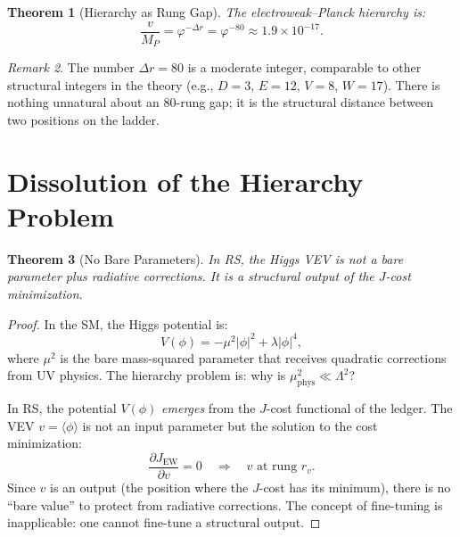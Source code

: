 \documentclass[12pt,a4paper]{article}
\newtheorem{theorem}{Theorem}[section]
\theoremstyle{definition}
\theoremstyle{remark}
\newtheorem{remark}[theorem]{Remark}
\begin{document}
\begin{theorem}[Hierarchy as Rung Gap]
\label{thm:hierarchy}
The electroweak--Planck hierarchy is:
\begin{equation}
  \boxed{\frac{v}{M_P} = \varphi^{-\Delta r}
  = \varphi^{-80} \approx 1.9 \times 10^{-17}.}
  \label{eq:hierarchy}
\end{equation}
\end{theorem}

\begin{remark}
The number $\Delta r = 80$ is a moderate integer, comparable
to other structural integers in the theory (e.g., $D = 3$,
$E = 12$, $V = 8$, $W = 17$).  There is nothing unnatural
about an 80-rung gap; it is the structural distance between
two positions on the ladder.
\end{remark}

\section{Dissolution of the Hierarchy Problem}
\label{sec:dissolution}

\begin{theorem}[No Bare Parameters]
\label{thm:no-bare}
In RS, the Higgs VEV is not a bare parameter plus radiative
corrections.  It is a structural output of the $J$-cost
minimization.
\end{theorem}

\begin{proof}
In the SM, the Higgs potential is:
\begin{equation}
  V(\phi) = -\mu^2 |\phi|^2 + \lambda |\phi|^4,
\end{equation}
where $\mu^2$ is the bare mass-squared parameter that
receives quadratic corrections from UV physics.  The
hierarchy problem is: why is $\mu^2_{\mathrm{phys}} \ll
\Lambda^2$?

In RS, the potential $V(\phi)$ \emph{emerges} from the
$J$-cost functional of the ledger.  The VEV
$v = \langle \phi \rangle$ is not an input parameter but
the solution to the cost minimization:
\begin{equation}
  \frac{\partial J_{\mathrm{EW}}}{\partial v} = 0
  \quad \Rightarrow \quad v \text{ at rung } r_v.
\end{equation}
Since $v$ is an output (the position where the $J$-cost
has its minimum), there is no ``bare value'' to protect
from radiative corrections.  The concept of fine-tuning is
inapplicable: one cannot fine-tune a structural output.
\end{proof}
\end{document}
